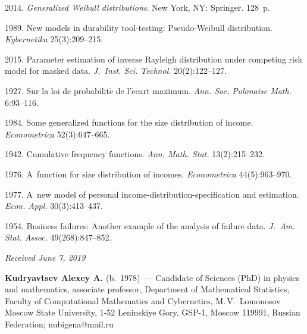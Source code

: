 \begin{multicols}{2}
{{\begin{thebibliography}{99}
 2014.  \textit{Generalized Weibull distributions}. New York, NY: 
Springer. 128~p.

 1989. New models in durability tool-testing: 
Pseudo-Weibull distribution.  \textit{Kybernetika} 25(3):209--215.

 2015. Parameter estimation of inverse Rayleigh distribution under 
 competing risk model for masked data. 
 \textit{J.~Inst. Sci. Technol.} 20(2):122--127.

 1927. 
Sur la loi de probabilit$\acute{\mbox{e}}$ de l'$\acute{\mbox{e}}$cart 
maximum. \textit{Ann. Soc. Polonaise  Math.} 6:93--116.

 1984.
 Some generalized functions for the size distribution of income. 
 \textit{Econometrica} 52(3):647--665.

 1942. Cumulative frequency functions.
 \textit{Ann. Math. Stat.} 13(2):215--232.

 1976. 
A~function for size distribution of incomes. \textit{Econometrica} 44(5):963--970.

 1977. A~new model of personal income-distribution-specification 
and estimation. 
\textit{Econ. Appl.} 30(3):413--437.

 1954. Business failures: Another 
example of the analysis of failure data. 
\textit{J.~Am. Stat. Assoc.} 49(268):847--852.
\end{thebibliography}

 }
 }

\end{multicols}


\hfill{\small\textit{Received June 7, 2019}}




\Contrl

\noindent
\textbf{Kudryavtsev Alexey A.} (b.\ 1978)~--- 
Candidate of Sciences (PhD) in physics and mathematics, associate professor,
 Department of Mathematical Statistics, Faculty of Computational Mathematics 
 and Cybernetics, M.\,V.~Lomonosov Moscow State University, 1-52 Leninskiye Gory, 
 GSP-1, Moscow 119991, Russian Federation; \mbox{nubigena@mail.ru}
\label{end\stat}

\renewcommand{\bibname}{\protect\rm Литература}  